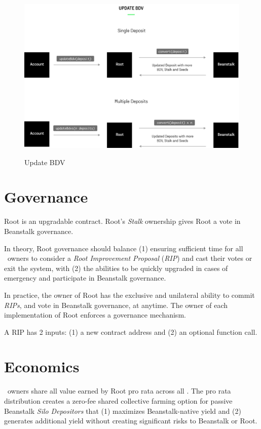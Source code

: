 \documentclass[tikz]{article}
\newcommand{\term}[1]{\textsl{#1}}
\newcommand{\Root}{} %
\begin{document}
\begin{figure}[h!]
    \centering
    \hbox{\hspace{1mm} \includegraphics[scale=0.8]{Figure5}}
    \caption{Update BDV}
    \label{fig 6}
\end{figure}

\newpage
\section{Governance}
Root is an upgradable contract. Root's \term{Stalk} ownership gives Root a vote in Beanstalk governance. 

In theory, Root governance should balance (1) ensuring sufficient time for all \Root\ owners to consider a \term{Root Improvement Proposal} (\term{RIP}) and cast their votes or exit the system, with (2) the abilities to be quickly upgraded in cases of emergency and participate in Beanstalk governance. 

In practice, the owner of Root has the exclusive and unilateral ability to commit \term{RIPs}, and vote in Beanstalk governance, at anytime. The owner of each implementation of Root enforces a governance mechanism.

A RIP has 2 inputs: (1) a new contract address and (2) an optional function call.

\section{Economics}
\Root\ owners share all value earned by Root pro rata across all \Root. The pro rata distribution creates a zero-fee shared collective farming option for passive Beanstalk \term{Silo} \term{Depositors} that (1) maximizes Beanstalk-native yield and (2) generates additional yield without creating significant risks to Beanstalk or Root.
\end{document}
